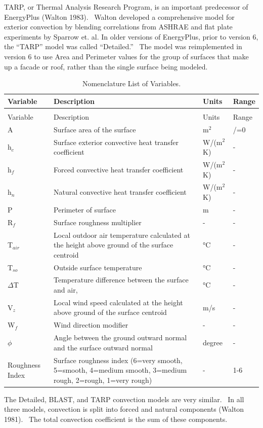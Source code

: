 TARP, or Thermal Analysis Research Program, is an important predecessor of EnergyPlus (Walton 1983).~ Walton developed a comprehensive model for exterior convection by blending correlations from ASHRAE and flat plate experiments by Sparrow et. al. In older versions of EnergyPlus, prior to version 6, the ``TARP'' model was called ``Detailed.''~ The model was reimplemented in version 6 to use Area and Perimeter values for the group of surfaces that make up a facade or roof, rather than the single surface being modeled.

\begin{longtable}[c]{p{1.5in}p{2.5in}p{1.0in}p{1.0in}}

\caption{Nomenclature List of Variables. \label{table:nomenclature-list-of-variables.-001}} \tabularnewline
\toprule
Variable & Description & Units & Range \tabularnewline
\midrule
\endfirsthead

\caption[]{Nomenclature List of Variables.} \tabularnewline
\toprule
Variable & Description & Units & Range \tabularnewline
\midrule
\endhead

A & Surface area of the surface & m\(^{2}\) & /=0 \tabularnewline
h\(_{c}\) & Surface exterior convective heat transfer coefficient & W/(m\(^{2}\)K) & - \tabularnewline
h\(_{f}\) & Forced convective heat transfer coefficient & W/(m\(^{2}\)K) & - \tabularnewline
h\(_{n}\) & Natural convective heat transfer coefficient & W/(m\(^{2}\)K) & - \tabularnewline
P & Perimeter of surface & m & - \tabularnewline
R\(_{f}\) & Surface roughness multiplier & - & - \tabularnewline
T\(_{air}\) & Local outdoor air temperature calculated at the height above ground of the surface centroid & °C & - \tabularnewline
T\(_{so}\) & Outside surface temperature & °C & - \tabularnewline
$\Delta$T & Temperature difference between the surface and air, & °C & - \tabularnewline
V\(_{z}\) & Local wind speed calculated at the height above ground of the surface centroid & m/s & - \tabularnewline
W\(_{f}\) & Wind direction modifier & - & - \tabularnewline
$\phi$ & Angle between the ground outward normal and the surface outward normal & degree & - \tabularnewline
Roughness Index & Surface roughness index (6=very smooth, 5=smooth, 4=medium smooth, 3=medium rough, 2=rough, 1=very rough) & - & 1-6 \tabularnewline
\bottomrule
\end{longtable}

The Detailed, BLAST, and TARP convection models are very similar.~ In all three models, convection is split into forced and natural components (Walton 1981).~ The total convection coefficient is the sum of these components.


